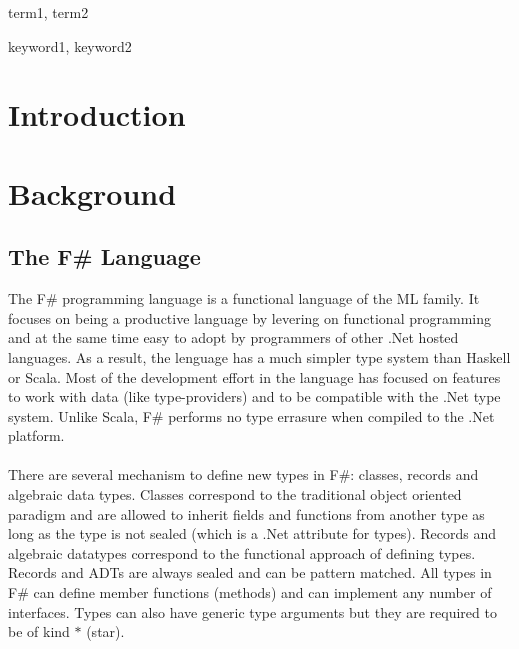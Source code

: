 \documentclass{sigplanconf}
\begin{document}
\terms
term1, term2

\keywords
keyword1, keyword2

\section{Introduction}

\section{Background}
\subsection{The F\# Language}
The F\# programming language is a functional language of the ML family. It focuses on being a productive language by levering on functional programming and at the same time easy to adopt by programmers of other .Net hosted languages. As a result, the lenguage has a much simpler type system than Haskell or Scala. Most of the development effort in the language has focused on features to work with data (like type-providers) and to be compatible with the .Net type system. Unlike Scala, F\# performs no type errasure when compiled to the .Net platform.
\\\\
There are several mechanism to define new types in F\#: classes, records and algebraic data types. Classes correspond to the traditional object oriented paradigm and are allowed to inherit fields and functions from another type as long as the type is not sealed (which is a .Net attribute for types). Records and algebraic datatypes correspond to the functional approach of defining types. Records and ADTs are always sealed and can be pattern matched. All types in F\# can define member functions (methods) and can implement any number of interfaces. Types can also have generic type arguments but they are required to be of kind $*$ (star).
\end{document}
